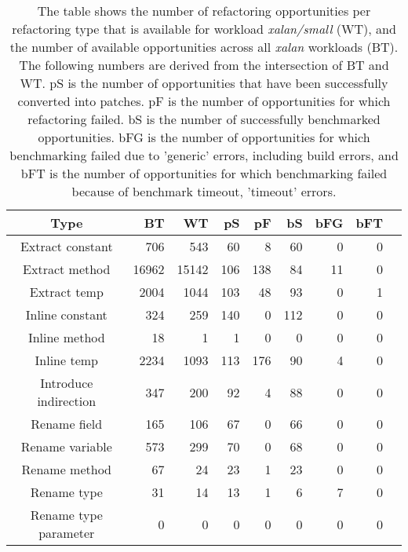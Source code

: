 \begin{table}[!h]
\caption{The table shows the number of refactoring opportunities per refactoring type that is available for workload \textit{xalan/small} (WT), and the number of available opportunities across all \textit{xalan} workloads (BT). The following numbers are derived from the intersection of BT and WT. pS is the number of opportunities that have been successfully converted into patches. pF is the number of opportunities for which refactoring failed. bS is the number of successfully benchmarked opportunities. bFG is the number of opportunities for which benchmarking failed due to 'generic' errors, including build errors, and bFT is the number of opportunities for which benchmarking failed because of benchmark timeout, 'timeout' errors.}
\begin{tabular}{c|*{7}{r}r}
Type&BT&WT&pS&pF&bS&bFG&bFT\\
\hline
Extract constant&706&543&60&8&60&0&0\\
Extract method&16962&15142&106&138&84&11&0\\
Extract temp&2004&1044&103&48&93&0&1\\
Inline constant&324&259&140&0&112&0&0\\
Inline method&18&1&1&0&0&0&0\\
Inline temp&2234&1093&113&176&90&4&0\\
Introduce indirection&347&200&92&4&88&0&0\\
Rename field&165&106&67&0&66&0&0\\
Rename variable&573&299&70&0&68&0&0\\
Rename method&67&24&23&1&23&0&0\\
Rename type&31&14&13&1&6&7&0\\
Rename type parameter&0&0&0&0&0&0&0\\
\end{tabular}
\end{table}
